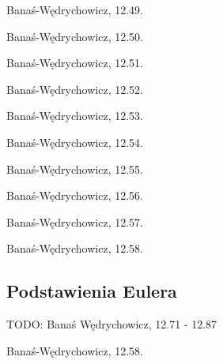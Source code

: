 \begin{multicols}{2}
\begin{problem}
    Banaś-Wędrychowicz, 12.49.
\end{problem}

\begin{problem}
    Banaś-Wędrychowicz, 12.50.
\end{problem}

\begin{problem}
    Banaś-Wędrychowicz, 12.51.
\end{problem}

\begin{problem}
    Banaś-Wędrychowicz, 12.52.
\end{problem}

\begin{problem}
    Banaś-Wędrychowicz, 12.53.
\end{problem}

\begin{problem}
    Banaś-Wędrychowicz, 12.54.
\end{problem}

\begin{problem}
    Banaś-Wędrychowicz, 12.55.
\end{problem}

\begin{problem}
    Banaś-Wędrychowicz, 12.56.
\end{problem}

\begin{problem}
    Banaś-Wędrychowicz, 12.57.
\end{problem}

\begin{problem}
    Banaś-Wędrychowicz, 12.58.
\end{problem}

\end{multicols}

\subsection{Podstawienia Eulera}

TODO: Banaś Wędrychowicz, 12.71 - 12.87

\begin{problem}
    Banaś-Wędrychowicz, 12.58.
\end{problem}

%